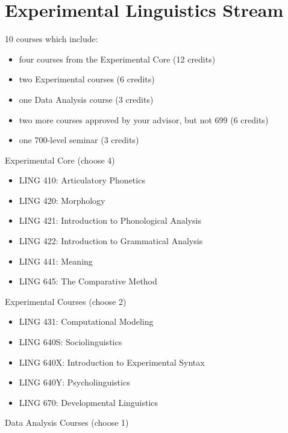 \documentclass[
]{book}
\providecommand{\tightlist}{%
  \setlength{\itemsep}{0pt}\setlength{\parskip}{0pt}}
\begin{document}
\section{Experimental Linguistics Stream}\label{experimental-stream}

10 courses which include:

\begin{itemize}
\tightlist
\item
  four courses from the Experimental Core (12 credits)
\item
  two Experimental courses (6 credits)
\item
  one Data Analysis course (3 credits)
\item
  two more courses approved by your advisor, but not 699 (6 credits)
\item
  one 700-level seminar (3 credits)
\end{itemize}

Experimental Core (choose 4)

\begin{itemize}
\tightlist
\item
  LING 410: Articulatory Phonetics
\item
  LING 420: Morphology
\item
  LING 421: Introduction to Phonological Analysis
\item
  LING 422: Introduction to Grammatical Analysis
\item
  LING 441: Meaning
\item
  LING 645: The Comparative Method
\end{itemize}

Experimental Courses (choose 2)

\begin{itemize}
\tightlist
\item
  LING 431: Computational Modeling
\item
  LING 640S: Sociolinguistics
\item
  LING 640X: Introduction to Experimental Syntax
\item
  LING 640Y: Psycholinguistics
\item
  LING 670: Developmental Linguistics
\end{itemize}

Data Analysis Courses (choose 1)
\end{document}
